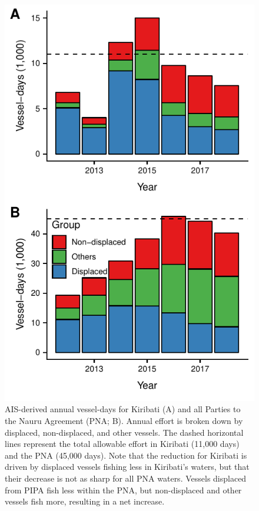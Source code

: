 \documentclass[12pt]{article}
\begin{document}
\begin{figure}[htbp]
\centering
\includegraphics{img/all_PS_VDS_PNA_KIR_year.pdf}
\caption{\label{fig:all_PS_VDS_year}AIS-derived annual vessel-days for Kiribati (A) and all Parties to the Nauru Agreement (PNA; B). Annual effort is broken down by displaced, non-displaced, and other vessels. The dashed horizontal lines represent the total allowable effort in Kiribati (11,000 days) and the PNA (45,000 days). Note that the reduction for Kiribati is driven by displaced vessels fishing less in Kiribati's waters, but that their decrease is not as sharp for all PNA waters. Vessels displaced from PIPA fish less within the PNA, but non-displaced and other vessels fish more, resulting in a net increase.}
\end{figure}
\end{document}

